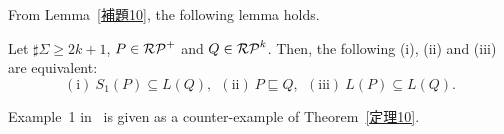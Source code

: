 




From Lemma~\ref{補題10}, the following lemma holds.
\begin{thm}\label{定理10}
    Let $\sharp\Sigma \geq 2k+1$, $P \in \mathcal{RP}^{+}$ and $Q \in \mathcal{RP}^{k}$.
    Then, the following (i), (ii) and (iii) are equivalent:
    \[
        (\mathrm{i})\ S_{1}(P) \subseteq L(Q),\ \
        (\mathrm{ii})\ P \sqsubseteq Q,\ \
        (\mathrm{iii})\ L(P) \subseteq L(Q).
    \]
\end{thm}
%

Example~1 in~\cite{Sato1} is given as a counter-example of Theorem~\ref{定理10}.

